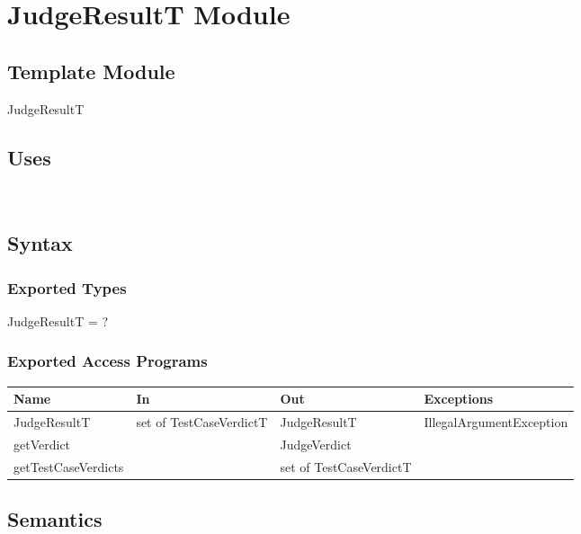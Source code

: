 \documentclass[12pt, titlepage]{article}
\begin{document}
\newpage

\section{JudgeResultT Module} \label{JudgeResultT} 

\subsection{Template Module}

JudgeResultT

\subsection{Uses}

\\

\subsection{Syntax}

\subsubsection{Exported Types}

JudgeResultT = ?

\subsubsection{Exported Access Programs}

\begin{center}
\begin{tabular}{ |  p{4cm} | p{5cm} |  p{3cm} | p{5cm} | }
\hline
\textbf{Name} & \textbf{In} & \textbf{Out} & \textbf{Exceptions} \\
\hline
JudgeResultT & set of TestCaseVerdictT & JudgeResultT &  IllegalArgumentException \\
getVerdict &   & JudgeVerdict &  \\
getTestCaseVerdicts &   & set of TestCaseVerdictT &  \\
\hline
\end{tabular}
\end{center}

\subsection{Semantics}
\end{document}
